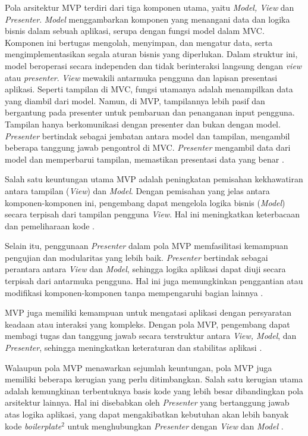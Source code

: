 \documentclass[conference]{IEEEtran}
\begin{document}
	Pola arsitektur MVP terdiri dari tiga komponen utama, yaitu \textit{Model, View} dan \textit{Presenter}.
	\textit{Model} menggambarkan komponen yang menangani data dan logika bisnis dalam sebuah aplikasi, serupa dengan fungsi model dalam MVC. Komponen ini bertugas mengolah, menyimpan, dan mengatur data, serta mengimplementasikan segala aturan bisnis yang diperlukan. Dalam struktur ini, model beroperasi secara independen dan tidak berinteraksi langsung dengan \textit{view} atau \textit{presenter}.
	\textit{View} mewakili antarmuka pengguna dan lapisan presentasi aplikasi. Seperti tampilan di MVC, fungsi utamanya adalah menampilkan data yang diambil dari model. Namun, di MVP, tampilannya lebih pasif dan bergantung pada presenter untuk pembaruan dan penanganan input pengguna. Tampilan hanya berkomunikasi dengan presenter dan bukan dengan model.
	\textit{Presenter} bertindak sebagai jembatan antara model dan tampilan, mengambil beberapa tanggung jawab pengontrol di MVC. \textit{Presenter} mengambil data dari model dan memperbarui tampilan, memastikan presentasi data yang benar \cite{Dan2020}. 

    Salah satu keuntungan utama MVP adalah peningkatan pemisahan kekhawatiran antara tampilan (\textit{View}) dan \textit{Model}. Dengan pemisahan yang jelas antara komponen-komponen ini, pengembang dapat mengelola logika bisnis (\textit{Model}) secara terpisah dari tampilan pengguna \textit{View}. Hal ini meningkatkan keterbacaan dan pemeliharaan kode \cite{brp2020}. 

    Selain itu, penggunaan \textit{Presenter} dalam pola MVP memfasilitasi kemampuan pengujian dan modularitas yang lebih baik. \textit{Presenter} bertindak sebagai perantara antara \textit{View} dan \textit{Model}, sehingga logika aplikasi dapat diuji secara terpisah dari antarmuka pengguna. Hal ini juga memungkinkan penggantian atau modifikasi komponen-komponen tanpa mempengaruhi bagian lainnya \cite{brp2020}.

    MVP juga memiliki kemampuan untuk mengatasi aplikasi dengan persyaratan keadaan atau interaksi yang kompleks. Dengan pola MVP, pengembang dapat membagi tugas dan tanggung jawab secara terstruktur antara \textit{View, Model}, dan \textit{Presenter}, sehingga meningkatkan keteraturan dan stabilitas aplikasi \cite{brp2020}.
	
    Walaupun pola MVP menawarkan sejumlah keuntungan, pola MVP juga memiliki beberapa kerugian yang perlu ditimbangkan. Salah satu kerugian utama adalah kemungkinan terbentuknya basis kode yang lebih besar dibandingkan pola arsitektur lainnya. Hal ini disebabkan oleh \textit{Presenter} yang bertanggung jawab atas logika aplikasi, yang dapat mengakibatkan kebutuhan akan lebih banyak kode \textit{boilerplate}$^2$ untuk menghubungkan \textit{Presenter} dengan \textit{View} dan \textit{Model} \cite{brp2020}.
\end{document}
